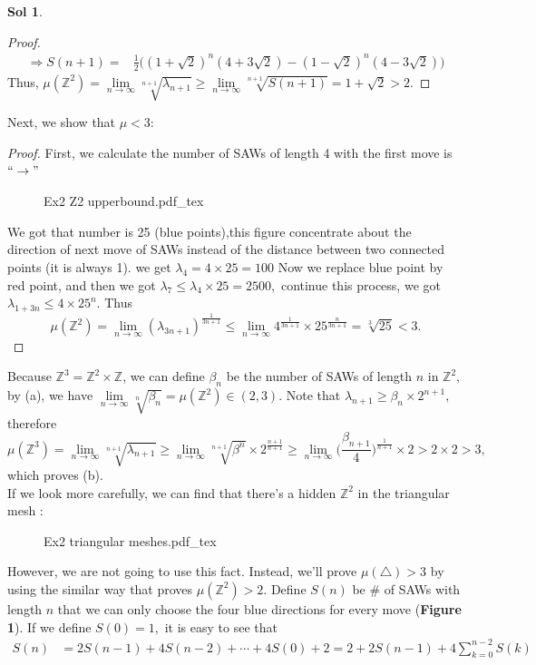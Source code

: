 \documentclass[12pt,a4paper]{report}
\theoremstyle{definition}
\newtheorem*{sol}{Sol}
\newcommand{\incfig}[1]{%
{#1.pdf_tex}
}
\begin{document}
\begin{sol}
\begin{proof}
\begin{align*}
	    \Rightarrow S(n+1)=& \frac{1}{2}\Big((1+\sqrt{2})^n(4+3\sqrt{2})-(1-\sqrt{2})^n(4-3\sqrt{2})\Big)
	    \end{align*}
	    Thus, $\mu(\mathbb{Z}^2)=\lim\limits_{n\to\infty}\sqrt[n+1]{\lambda_{n+1}}\geq \lim\limits_{n\to\infty}\sqrt[n+1]{S(n+1)}=1+\sqrt{2}>2.$
	    \end{proof}
	    Next, we show that $\mu<3:$
	    \begin{proof}
	    First, we calculate the number of SAWs of length 4 with the first move is $``\rightarrow"$
		\begin{figure}[htp]
		\centering
		\def\svgwidth{8cm}
		\incfig{Ex2 Z2 upperbound}
		\end{figure}
		We got that number is 25 (blue points),this figure concentrate about the direction of next move of SAWs instead of the distance between two connected points (it is always 1). we get $\lambda_{4}=4\times 25=100$ Now we replace blue point by red point, and then we got $\lambda_7\leq \lambda_4\times 25=2500,$ continue this process, we got $\lambda_{1+3n}\leq 4\times 25^n.$ Thus 
		\[
		\mu(\mathbb{Z}^2)=\lim_{n\to\infty}(\lambda_{3n+1})^{\frac{1}{3n+1}}\leq \lim_{n\to\infty}4^{\frac{1}{3n+1}}\times 25^{\frac{n}{3n+1}}=\sqrt[3]{25}<3.
		\]
		\end{proof}
		Because $\mathbb{Z}^3=\mathbb{Z}^2\times \mathbb{Z}$, we can define $\beta_n$ be the number of SAWs of length $n$ in $\mathbb{Z}^2,$ by (a), we have $\lim\limits_{n\to\infty}\sqrt[n]{\beta_n}=\mu(\mathbb{Z}^2)\in(2,3).$ Note that $\lambda_{n+1}\geq \beta_n\times 2^{n+1},$ therefore 
		\[
		\mu(\mathbb{Z}^3)=\lim_{n\to\infty}\sqrt[n+1]{\lambda_{n+1}}\geq \lim_{n\to\infty}\sqrt[n+1]{\beta^n}\times 2^{\frac{n+1}{n+1}}\geq \lim_{n\to\infty}\Big(\frac{\beta_{n+1}}{4}\Big)^{\frac{1}{n+1}}\times 2>2\times 2>3,
		\]
		which proves (b).\\
		If we look more carefully, we can find that there's a hidden $\mathbb{Z}^2$ in the triangular mesh :
		\begin{figure}[htp]
		\centering
		\def\svgwidth{6cm}
		\incfig{Ex2 triangular meshes}
		\end{figure}
		However, we are not going to use this fact. Instead, we'll prove $\mu(\triangle)>3$ by using the similar way that proves $\mu(\mathbb{Z}^2)>2.$ Define $S(n)$ be \# of SAWs with length $n$ that we can only choose the four blue directions for every move (\textbf{Figure 1}). If we define $S(0)=1,$ it is easy to see that 
		\begin{align*}
		S(n)&=2S(n-1)+4S(n-2)+\cdots +4S(0)+2=2+2S(n-1)+4\sum_{k=0}^{n-2}S(k)\\

\end{align*}
\end{sol}
\end{document}
